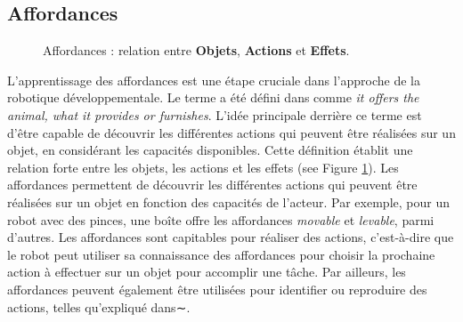 \documentclass{llncs}
\begin{document}
\subsection{Affordances}

\begin{figure}
  \centering

  \label{fig:affordances}
	\caption{Affordances : relation entre \textbf{Objets}, \textbf{Actions} et \textbf{Effets}.}

\end{figure}

L'apprentissage des affordances est une étape cruciale dans l'approche de la robotique développementale. Le terme a été défini dans \cite{opac-b1085639} comme \textit{it offers the animal, what it provides or furnishes}. L'idée principale derrière ce terme est d'être capable de découvrir les différentes actions qui peuvent être réalisées sur un objet, en considérant les capacités disponibles. Cette définition établit une relation forte entre les objets, les actions et les effets (see Figure \ref{fig:affordances}). Les affordances permettent de découvrir les différentes actions qui peuvent être réalisées sur un objet en fonction des capacités de l'acteur. Par exemple, pour un robot avec des pinces, une boîte offre les affordances \textit{movable} et \textit{levable}, parmi d'autres. Les affordances sont capitables pour réaliser des actions, c'est-à-dire que le robot peut utiliser sa connaissance des affordances pour choisir la prochaine action à effectuer sur un objet pour accomplir une tâche. Par ailleurs, les affordances peuvent également être utilisées pour identifier ou reproduire des actions, telles qu'expliqué dans∼\cite{4399517}.
\end{document}
